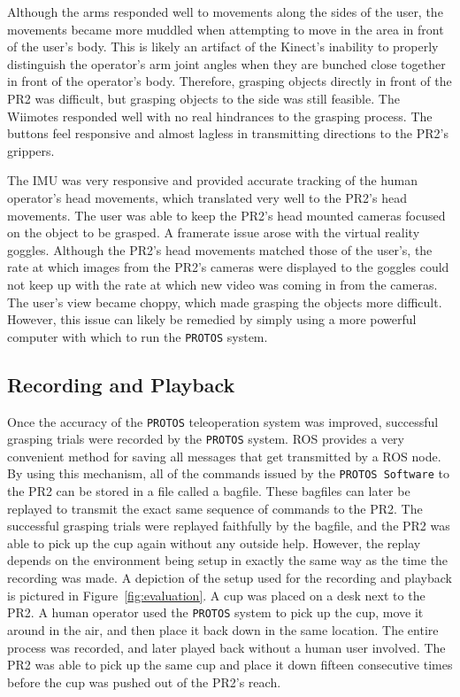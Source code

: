 \documentclass{sig-alternate}
\begin{document}
\indent Although the arms responded well to movements along the sides of the user, the movements became more
muddled when attempting to move in the area in front of the user's body. This is likely an artifact of the Kinect's inability to properly distinguish the operator's arm 
joint angles when they are bunched close together in front of the operator's body. Therefore, grasping objects directly in front of the PR2 was difficult, but grasping
objects to the side was still feasible. The Wiimotes responded well with no real hindrances to the grasping process. The buttons feel responsive and almost lagless in
transmitting directions to the PR2's grippers.

\indent The IMU was very responsive and provided accurate tracking of the human operator's head movements, which translated very well to the PR2's head movements. The user 
was able to keep the PR2's head mounted cameras focused on the object to be grasped. A framerate issue arose with the virtual reality goggles. Although the PR2's head movements
matched those of the user's, the rate at which images from the PR2's cameras were displayed to the goggles could not keep up with the rate at which new video was coming
in from the cameras. The user's view became choppy, which made grasping the objects more difficult. However, this issue can likely be remedied by simply using a more
powerful computer with which to run the {\tt PROTOS} system.

\subsection{Recording and Playback}
\indent Once the accuracy of the {\tt PROTOS} teleoperation system was improved, successful grasping trials were recorded by the {\tt PROTOS} system. ROS provides a very
convenient method for saving all messages that get transmitted by a ROS node. By using this mechanism, all of the commands issued by the {\tt PROTOS Software} to the PR2
can be stored in a file called a bagfile. These bagfiles can later be replayed to transmit the exact same sequence of commands to the PR2. The successful grasping trials
were replayed faithfully by the bagfile, and the PR2 was able to pick up the cup again without any outside help. However, the replay depends on the environment being setup
in exactly the same way as the time the recording was made. A depiction of the setup used for the recording and playback is pictured in Figure~\ref{fig:evaluation}. A cup
was placed on a desk next to the PR2. A human operator used the {\tt PROTOS} system to pick up the cup, move it around in the air, and then place it back down in the same location.
The entire process was recorded, and later played back without a human user involved. The PR2 was able to pick up the same cup and place it down fifteen consecutive times
before the cup was pushed out of the PR2's reach.
\end{document}
